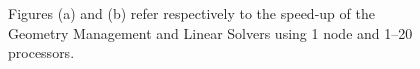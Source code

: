 \documentclass[11pt,a4paper]{article}
\begin{document}
\begin{figure}[H]
    \centering
    \quad
    \caption[]{Figures (a) and (b) refer respectively to the speed-up of the Geometry Management and Linear Solvers using 1 node and 1--20 processors.}
    \label{fig:scaling}
\end{figure}
\end{document}
